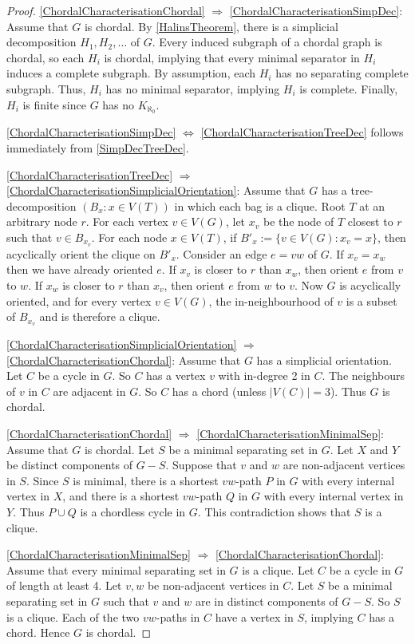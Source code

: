\documentclass[a4paper,11pt]{article}
\theoremstyle{plain}
\theoremstyle{definition}
\begin{document}
\begin{proof}
\cref{ChordalCharacterisationChordal} $\Longrightarrow$ \cref{ChordalCharacterisationSimpDec}: Assume that $G$ is chordal. By \cref{HalinsTheorem}, there is a simplicial decomposition $H_1,H_2,\dots$ of $G$. Every induced subgraph of a chordal graph is chordal, so each $H_i$ is chordal, implying that every minimal separator in $H_i$ induces a complete subgraph. By assumption, each $H_i$ has no separating complete subgraph. Thus, $H_i$ has no minimal separator, implying $H_i$ is complete. Finally, $H_i$ is finite since $G$ has no $K_{\aleph_0}$.

\cref{ChordalCharacterisationSimpDec}
$\Longleftrightarrow$ \cref{ChordalCharacterisationTreeDec} follows immediately from \cref{SimpDecTreeDec}.

\cref{ChordalCharacterisationTreeDec} $\Longrightarrow$ \cref{ChordalCharacterisationSimplicialOrientation}: Assume that $G$ has a tree-decomposition $(B_x:x\in V(T))$ in which each bag is a clique. Root $T$ at an arbitrary node $r$. For each vertex $v\in V(G)$, let $x_v$ be the node of $T$ closest to $r$ such that $v\in B_{x_v}$. For each node $x\in V(T)$, if $B'_x:=\{v\in V(G):x_v=x\}$, then acyclically orient the clique on $B'_x$. Consider an edge $e=vw$ of $G$. 
If $x_v=x_w$ then we have already oriented $e$. If $x_v$ is closer to $r$ than $x_w$, then orient $e$ from $v$ to $w$. If $x_w$ is closer to $r$ than $x_v$, then orient $e$ from $w$ to $v$. Now $G$ is acyclically oriented, and for every vertex $v\in V(G)$, the in-neighbourhood of $v$ is a subset of $B_{x_v}$ and is therefore a clique.
 
\cref{ChordalCharacterisationSimplicialOrientation} $\Longrightarrow$ \cref{ChordalCharacterisationChordal}: Assume that $G$ has a simplicial orientation. Let $C$ be a cycle in $G$. So $C$ has a vertex $v$ with in-degree 2 in $C$. The neighbours of $v$ in $C$ are adjacent in $G$. So $C$ has a chord (unless $|V(C)|=3$). Thus $G$ is chordal.

\cref{ChordalCharacterisationChordal} $\Longrightarrow$ \cref{ChordalCharacterisationMinimalSep}: Assume that $G$ is chordal. Let $S$ be a minimal separating set in $G$. Let $X$ and $Y$ be distinct components of $G-S$. Suppose that $v$ and $w$ are non-adjacent vertices in $S$. Since $S$ is minimal, 
there is a shortest $vw$-path $P$ in $G$ with every internal vertex in $X$, and
there is a shortest $vw$-path $Q$ in $G$ with every internal vertex in $Y$. 
Thus $P\cup Q$ is a chordless cycle in $G$. This contradiction shows that $S$ is a clique. 

\cref{ChordalCharacterisationMinimalSep} $\Longrightarrow$ 
\cref{ChordalCharacterisationChordal}: Assume that every minimal separating set in $G$ is a clique. Let $C$ be a cycle in $G$ of length at least 4. Let $v,w$ be non-adjacent vertices in $C$. Let $S$ be a minimal separating set in $G$ such that $v$ and $w$ are in distinct components of $G-S$. So $S$ is a clique. Each of the two $vw$-paths in $C$ have a vertex in $S$, implying $C$ has a chord. Hence $G$ is chordal. 
\end{proof}
\end{document}
